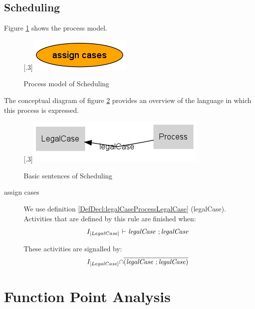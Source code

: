 \documentclass[10pt,a4paper]{report}              %
\theoremstyle{plain}\theorembodyfont{\rmfamily}\newtheorem{definition}{Definition}[section]
\theoremstyle{plain}\theorembodyfont{\rmfamily}\newtheorem{designrule}[definition]{Requirement}
\def\id#1{\mbox{\em #1\/}}
\newcommand{\cmpl}[1]{\overline{#1}}
\begin{document}
\section{Scheduling}

Figure \ref{fig:ProcScheduling} shows the process model.

\begin{figure}[htb]
\begin{center}
\scalebox{.3}[.3]{\includegraphics{ProcScheduling}}
\caption{Process model of Scheduling}
\label{fig:ProcScheduling}
\end{center}
\end{figure}
The conceptual diagram of figure \ref{fig:PLScheduling} provides an overview of the language in which this process is expressed.

\begin{figure}[htb]
\begin{center}
\scalebox{.3}[.3]{\includegraphics{PLScheduling}}
\caption{Basic sentences of Scheduling}
\label{fig:PLScheduling}
\end{center}
\end{figure}
\begin{description}
\item[assign cases]
We use definition \ref{DefDecl:legalCaseProcessLegalCase} (legalCase). 
Activities that are defined by this rule are finished when: 
\begin{equation}
   I_{[LegalCase]}\ {\vdash}\ {\id{legalCase}}~;{\id{legalCase}}\label{DefRule:assign cases}
\end{equation}

 These activities are signalled by:
\begin{equation}
   I_{[LegalCase]}{\cap}\cmpl{({\id{legalCase}}~;{\id{legalCase}})}\label{DefRule:assign cases}
\end{equation}

\end{description}
\chapter{Function Point Analysis}\label{chpFPAnalysis}
\end{document}

